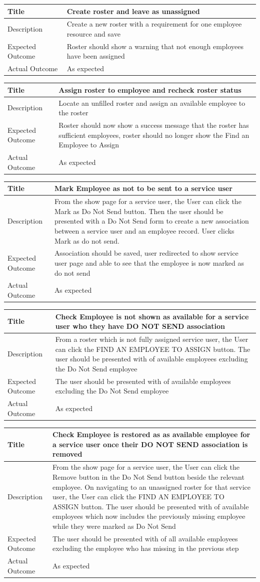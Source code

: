 \documentclass[a4paper,Times New Roman 11pt]{article}
\newcommand\addrow[2]{#1 &#2\\ }
\newcommand\addheading[2]{#1 &#2\\ \hline}
\newcommand\tabularhead{\begin{tabular}{lp{9cm}}
\hline
}
\newenvironment{usecase}{\tabularhead}
{\hline\end{tabular}}
\begin{document}
\begin{usecase}
    \addheading{Title}{Create roster and leave as unassigned}
  \addheading{Description}{Create a new roster with a requirement for one employee resource and save}
  \addrow{Expected Outcome}{Roster should show a warning that not enough employees have been assigned}
  \addrow{Actual Outcome}{As expected}
\end{usecase}

\begin{usecase}
    \addheading{Title}{Assign roster to employee and recheck roster status}
  \addheading{Description}{Locate an unfilled roster and assign an available employee to the roster}
  \addrow{Expected Outcome}{Roster should now show a success message that the roster has sufficient employees, roster should no longer show the Find an Employee to Assign}
  \addrow{Actual Outcome}{As expected}
\end{usecase}

\begin{usecase}
    \addheading{Title}{Mark Employee as not to be sent to a service user}
  \addheading{Description}{From the show page for a service user, the User can click the Mark as Do Not Send button. Then the user should be presented with a Do Not Send form to create a new association between a service user and an employee record. User clicks Mark as do not send.}
  \addrow{Expected Outcome}{ Association should be saved, user redirected to show service user page and able to see that the employee is now marked as do not send }
  \addrow{Actual Outcome}{As expected}
\end{usecase}

\begin{usecase}
    \addheading{Title}{Check Employee is not shown as available for a service user who they have DO NOT SEND association}
  \addheading{Description}{From a roster which is not fully assigned service user, the User  can click the FIND AN EMPLOYEE TO ASSIGN button. The user should be presented with of available employees excluding the Do Not Send employee}
  \addrow{Expected Outcome}{ The user should be presented with of available employees excluding the Do Not Send employee}
  \addrow{Actual Outcome}{As expected}
\end{usecase}

\begin{usecase}
    \addheading{Title}{Check Employee is restored as as available employee for a service user once their DO NOT SEND association is removed}
  \addheading{Description}{From the show page for a service user, the User  can click the Remove button in the Do Not Send button beside the relevant employee. On navigating to an unassigned roster for that service user, the User can click the FIND AN EMPLOYEE TO ASSIGN button. The user should be presented with of available employees which now includes the previously missing employee while they were marked as Do Not Send }
  \addrow{Expected Outcome}{ The user should be presented with of all available employees excluding the employee who has missing in the previous step }
  \addrow{Actual Outcome}{As expected}
\end{usecase}
\end{document}
